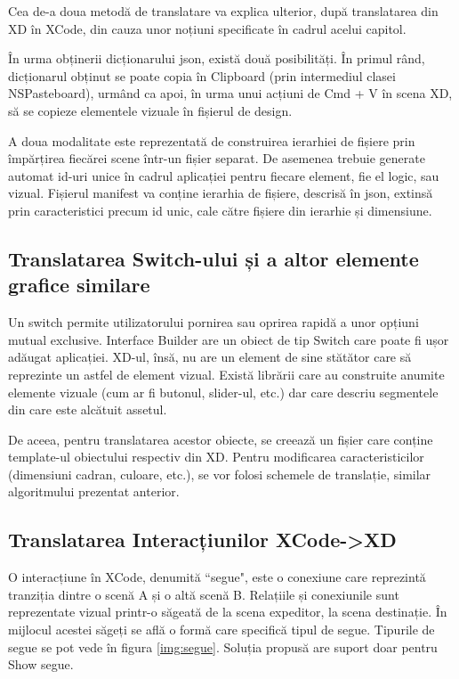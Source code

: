 Cea de-a doua metodă de translatare va explica ulterior, după translatarea din XD în XCode, din cauza unor noțiuni specificate în cadrul acelui capitol.

În urma obținerii dicționarului json, există două posibilități. În primul rând, dicționarul obținut se poate copia în Clipboard (prin intermediul clasei NSPasteboard), urmând ca apoi, în urma unui acțiuni de Cmd + V în scena XD, să se copieze elementele vizuale în fișierul de design.

A doua modalitate este reprezentată de construirea ierarhiei de fișiere prin împărțirea fiecărei scene într-un fișier separat. De asemenea trebuie generate automat id-uri unice în cadrul aplicației pentru fiecare element, fie el logic, sau vizual. Fișierul manifest va conține ierarhia de fișiere, descrisă în json, extinsă prin caracteristici precum id unic, cale către fișiere din ierarhie și dimensiune.



\subsection{Translatarea Switch-ului și a altor elemente grafice similare}

Un switch permite utilizatorului pornirea sau oprirea rapidă a unor opțiuni mutual exclusive. 
Interface Builder are un obiect de tip Switch care poate fi ușor adăugat aplicației. XD-ul, însă, nu are un element de sine stătător care să reprezinte un astfel de element vizual. Există librării care au construite anumite elemente vizuale (cum ar fi butonul, slider-ul, etc.) dar care descriu segmentele din care este alcătuit assetul. 

De aceea, pentru translatarea acestor obiecte, se creează un fișier care conține template-ul obiectului respectiv din XD. Pentru modificarea caracteristicilor (dimensiuni cadran, culoare, etc.), se vor folosi schemele de translație, similar algoritmului prezentat anterior.

\subsection{Translatarea Interacțiunilor XCode->XD}

O interacțiune în XCode, denumită ``segue", este o conexiune care reprezintă tranziția dintre o scenă A și o altă scenă B. Relațiile și conexiunile sunt reprezentate vizual printr-o săgeată de la scena expeditor, la scena destinație. În mijlocul acestei săgeți se află o formă care specifică tipul de segue. Tipurile de segue se pot vede în figura \ref{img:segue}. Soluția propusă are suport doar pentru Show segue.

